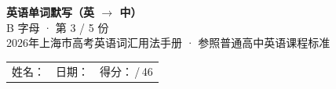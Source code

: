 \documentclass[10pt,a4paper]{article}
\begin{document}
\pagestyle{plain}

\begin{center}
{\LARGE\bfseries 英语单词默写（英 $\to$ 中）}\\[0.22em]
{\large B 字母 · 第 3 / 5 份}\\[0.18em]
{\small 2026年上海市高考英语词汇用法手册 · 参照普通高中英语课程标准}
\end{center}

\vspace{0.25em}
\noindent\begin{tabular}{@{}p{}@{}p{}@{}p{}@{}}
姓名：\underline{\hspace{2.0cm}} & 日期：\underline{\hspace{2.0cm}} & 得分：\underline{\hspace{1.3cm}}\,/\,46 \\
\end{tabular}

\vspace{0.3em}

\vspace{0.08em}
\end{document}
